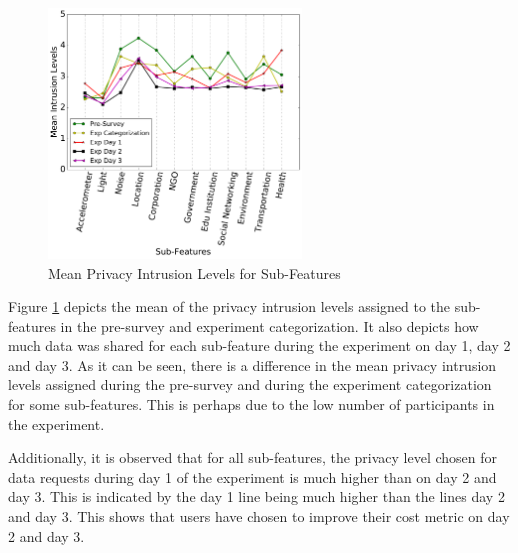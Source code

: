 \begin{figure}[ht!]
\centering
\includegraphics[width=0.6\textwidth,keepaspectratio]{./images/all_sub_mean}
\caption{Mean Privacy Intrusion Levels for Sub-Features}
\label{fig:sum_mean}
\end{figure}

Figure \ref{fig:sum_mean} depicts the mean of the privacy intrusion levels assigned to the sub-features in the pre-survey and experiment categorization. It also depicts how much data was shared for each sub-feature during the experiment on day 1, day 2 and day 3. As it can be seen, there is a difference in the mean privacy intrusion levels assigned during the pre-survey and during the experiment categorization for some sub-features. This is perhaps due to the low number of participants in the experiment.

Additionally, it is observed that for all sub-features, the privacy level chosen for data requests during day 1 of the experiment is much higher than on day 2 and day 3. This is indicated by the day 1 line being much higher than the lines day 2 and day 3. This shows that users have chosen to improve their cost metric on day 2 and day 3.

